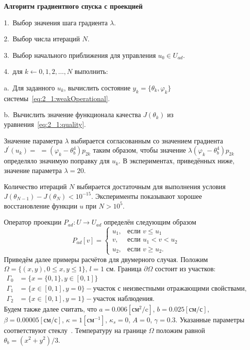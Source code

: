 \textbf{Алгоритм градиентного спуска с проекцией}

1.\ Выбор значения шага градиента $\lambda$.

2.\ Выбор числа итераций $N$.

3.\ Выбор начального приближения для управления $u_0 \in U_{ad}$.

4.\ для $k \leftarrow 0,1,2, \ldots, N$ выполнить:

\hspace{1cm} a.\ Для заданного $u_{k}$, вычислить состояние $y_k = \{\theta_k, \varphi_k\}$
системы~\eqref{eq:2_1:weakOperational}.

\hspace{1cm} b.\ Вычислить значение функционала качества
$J(\theta_k)$ из уравнения~\eqref{eq:2_1:quality}.

Значение параметра $\lambda$ выбирается согласованным со значением
градиента $J^{\prime}\left(u_{k}\right)=$ $=\left(\varphi_{k}-\theta_{b}^{4}\right) p_{2k}$
таким образом, чтобы значение $\lambda\left(\varphi_{k}-\theta_{b}^{4}\right) p_{2k}$
определяло значимую поправку для $u_{k}$.
В экспериментах, приведённых ниже, значение параметра $\lambda=20$.

Количество итераций $N$ выбирается достаточным для выполнения условия
$J\left(\theta_{N-1}\right)-J\left(\theta_{N}\right)<10^{-15}$.
Эксперименты показывают хорошее восстановление функции $u$ при $N>10^{5}$.

Оператор проекции $P_{ad} : U \to U_{ad}$ определён следующим образом
\[
    P_{ad}[v] =
    \begin{cases}
        u_1, & \text{если } v \le u_1 \\
        v, & \text{если } u_1 < v < u_2 \\
        u_2, & \text{если } v \ge u_2.
    \end{cases}
\]
Приведём далее примеры расчётов для двумерного случая.
Положим $\Omega = \{(x,y), 0 \leq x,y \leq 1\}$, $l = 1$ см.
Граница $\partial\Omega$ состоит из участков:
\[
    \begin{aligned}
        \Gamma_0 & = \{x=\{0,1\}, y \in [0,1]\} \\
        \Gamma_1 & = \{x\in [0,1], y=0\}
        - \text{участок с неизвестными отражающими свойствами}, \\
        \Gamma_2 & = \{x \in [0,1], y=1\} - \text{участок наблюдения}.
    \end{aligned}
\]
Будем также далее считать, что $a = 0.006[\text{см}^2/\text{c}]$,
$b=0.025[\text{см}/\text{с}]$, $\beta = 0.00005[\text{см}/\text{с}]$,
$\kappa=1[\text{см}^{-1}]$, $\kappa_s = 0$, $A = 0$, $\gamma = 0.3$.
Указанные параметры соответствуют стеклу~\cite{Grenkin2016a}.
Температуру на границе $\Omega$ положим равной $\theta_b = (x^2+y^2)/3$.

